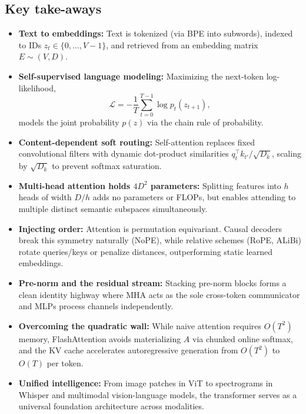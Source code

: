 \documentclass[11pt,a4paper]{article}
\theoremstyle{definition}
\theoremstyle{plain}
\begin{document}
\subsection{Key take-aways}
\begin{itemize}
\item \textbf{Text to embeddings:} Text is tokenized (via BPE into subwords), indexed to IDs $z_t \in \{0, \dots, V-1\}$, and retrieved from an embedding matrix $E \sim (V, D)$.
\item \textbf{Self-supervised language modeling:} Maximizing the next-token log-likelihood,
\begin{equation*}
\mathcal{L} = -\frac{1}{T} \sum_{t=0}^{T-1} \log p_t(z_{t+1}),
\end{equation*}
models the joint probability $p(z)$ via the chain rule of probability.
\item \textbf{Content-dependent soft routing:} Self-attention replaces fixed convolutional filters with dynamic dot-product similarities $q_t^\top k_{t'} / \sqrt{D_k}$, scaling by $\sqrt{D_k}$ to prevent softmax saturation.
\item \textbf{Multi-head attention holds $4D^2$ parameters:} Splitting features into $h$ heads of width $D/h$ adds no parameters or FLOPs, but enables attending to multiple distinct semantic subspaces simultaneously.
\item \textbf{Injecting order:} Attention is permutation equivariant. Causal decoders break this symmetry naturally (NoPE), while relative schemes (RoPE, ALiBi) rotate queries/keys or penalize distances, outperforming static learned embeddings.
\item \textbf{Pre-norm and the residual stream:} Stacking pre-norm blocks forms a clean identity highway where MHA acts as the sole cross-token communicator and MLPs process channels independently.
\item \textbf{Overcoming the quadratic wall:} While naive attention requires $O(T^2)$ memory, FlashAttention avoids materializing $A$ via chunked online softmax, and the KV cache accelerates autoregressive generation from $O(T^2)$ to $O(T)$ per token.
\item \textbf{Unified intelligence:} From image patches in ViT to spectrograms in Whisper and multimodal vision-language models, the transformer serves as a universal foundation architecture across modalities.
\end{itemize}
\end{document}
